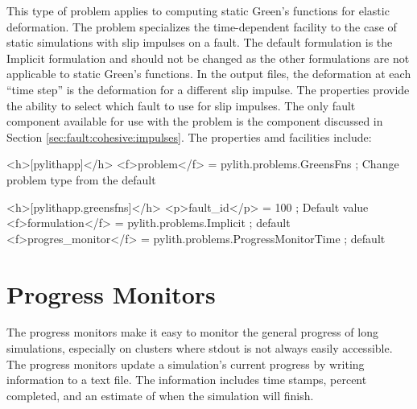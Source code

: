 This type of problem applies to computing static Green's functions
for elastic deformation. The  problem specializes
the time-dependent facility to the case of static simulations with
slip impulses on a fault. The default formulation is the Implicit
formulation and should not be changed as the other formulations are
not applicable to static Green's functions. In the output files, the
deformation at each ``time step'' is the deformation for a different
slip impulse. The properties provide the ability to select which fault
to use for slip impulses. The only fault component available for use
with the  problem is the 
component discussed in Section \vref{sec:fault:cohesive:impulses}.
The  properties amd facilities include:
\begin{inventory}
\end{inventory}

\begin{cfg}
<h>[pylithapp]</h>
<f>problem</f> = pylith.problems.GreensFns ; Change problem type from the default

<h>[pylithapp.greensfns]</h>
<p>fault_id</p> = 100 ; Default value
<f>formulation</f> = pylith.problems.Implicit ; default
<f>progres_monitor</f> = pylith.problems.ProgressMonitorTime ; default
\end{cfg}


\section{Progress Monitors}

The progress monitors make it easy to monitor the general progress of
long simulations, especially on clusters where stdout is not always
easily accessible. The progress monitors update a simulation's current
progress by writing information to a text file. The information
includes time stamps, percent completed, and an estimate of when the
simulation will finish.

